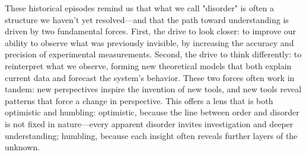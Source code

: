 These historical episodes remind us that what we call "disorder" is often a structure we haven't yet resolved—and that the path toward understanding is driven by two fundamental forces. First, the drive to look closer: to improve our ability to observe what was previously invisible, by increasing the accuracy and precision of experimental measurements. Second, the drive to think differently: to reinterpret what we observe, forming new theoretical models that both explain current data and forecast the system’s behavior. These two forces often work in tandem: new perspectives inspire the invention of new tools, and new tools reveal patterns that force a change in perspective. This offers a lens that is both optimistic and humbling: optimistic, because the line between order and disorder is not fixed in nature—every apparent disorder invites investigation and deeper understanding; humbling, because each insight often reveals further layers of the unknown. 

